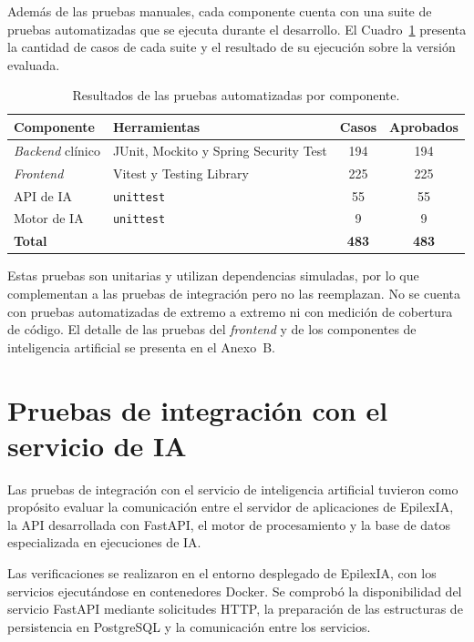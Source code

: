 \begin{nuevotexto}
Además de las pruebas manuales, cada componente cuenta con una suite de pruebas automatizadas que se ejecuta durante el desarrollo.
El Cuadro~\ref{tab:pruebas-automatizadas} presenta la cantidad de casos de cada suite y el resultado de su ejecución sobre la versión evaluada.

\begin{table}[H]
\centering
\marcanuevo
\caption{Resultados de las pruebas automatizadas por componente.}
\label{tab:pruebas-automatizadas}
\small
\begin{tabular}{|p{3.4cm}|p{6.2cm}|c|c|}
\hline
\textbf{Componente} & \textbf{Herramientas} & \textbf{Casos} & \textbf{Aprobados} \\
\hline
\textit{Backend} clínico & JUnit, Mockito y Spring Security Test & 194 & 194 \\
\hline
\textit{Frontend} & Vitest y Testing Library & 225 & 225 \\
\hline
API de IA & \texttt{unittest} & 55 & 55 \\
\hline
Motor de IA & \texttt{unittest} & 9 & 9 \\
\hline
\textbf{Total} & & \textbf{483} & \textbf{483} \\
\hline
\end{tabular}
\end{table}

Estas pruebas son unitarias y utilizan dependencias simuladas, por lo que complementan a las pruebas de integración pero no las reemplazan.
No se cuenta con pruebas automatizadas de extremo a extremo ni con medición de cobertura de código.
El detalle de las pruebas del \textit{frontend} y de los componentes de inteligencia artificial se presenta en el Anexo~B.
\end{nuevotexto}

\section{Pruebas de integración con el servicio de IA}

Las pruebas de integración con el servicio de
inteligencia artificial tuvieron como propósito
evaluar la comunicación entre el servidor de
aplicaciones de EpilexIA, la API desarrollada
con FastAPI, el motor de procesamiento y la
base de datos especializada en ejecuciones de IA.

Las verificaciones se realizaron en el entorno desplegado de EpilexIA, con los servicios ejecutándose en contenedores Docker.
Se comprobó la disponibilidad del servicio FastAPI mediante solicitudes HTTP, la preparación de las estructuras de persistencia en PostgreSQL y la comunicación entre los servicios.

